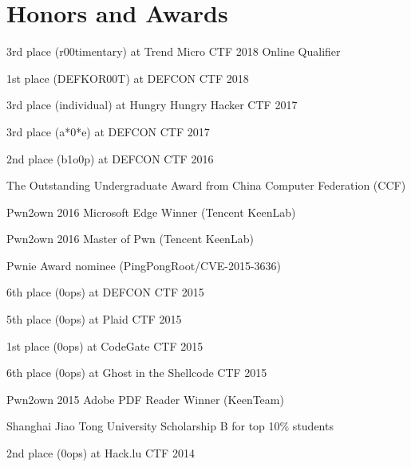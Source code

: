 \section*{Honors and Awards}
\begin{description}
	\item 3rd place (r00timentary) at Trend Micro CTF 2018 Online Qualifier 
	\item 1st place (DEFKOR00T) at DEFCON CTF 2018 
	\item 3rd place (individual) at Hungry Hungry Hacker CTF 2017 
	\item 3rd place (a*0*e) at DEFCON CTF 2017 
	\item 2nd place (b1o0p) at DEFCON CTF 2016 
	\item The Outstanding Undergraduate Award from China Computer Federation (CCF) 
	\item Pwn2own 2016 Microsoft Edge Winner (Tencent KeenLab) 
	\item Pwn2own 2016 Master of Pwn (Tencent KeenLab) 
	\item Pwnie Award nominee (PingPongRoot/CVE-2015-3636) 
	\item 6th place (0ops) at DEFCON CTF 2015 
	\item 5th place (0ops) at Plaid CTF 2015 
	\item 1st place (0ops) at CodeGate CTF 2015 
	\item 6th place (0ops) at Ghost in the Shellcode CTF 2015 
	\item Pwn2own 2015 Adobe PDF Reader Winner (KeenTeam) 
	\item Shanghai Jiao Tong University Scholarship B for top 10\% students 
	\item 2nd place (0ops) at Hack.lu CTF 2014 
\end{description}
